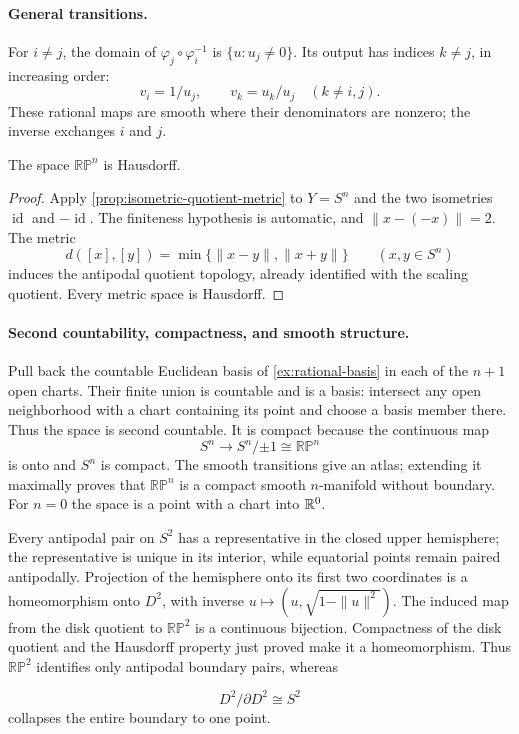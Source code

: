 \paragraph{General transitions.}
For $i\ne j$, the domain of $\varphi_j\circ\varphi_i^{-1}$ is
$\{u:u_j\ne0\}$. Its output has indices $k\ne j$, in increasing order:
\[
v_i=1/u_j,\qquad v_k=u_k/u_j\quad(k\ne i,j).
\]
These rational maps are smooth where their denominators are nonzero;
the inverse exchanges $i$ and $j$.

\begin{proposition}
The space $\mathbb{RP}^n$ is Hausdorff.
\end{proposition}
\begin{proof}
Apply \cref{prop:isometric-quotient-metric} to $Y=S^n$ and the two
isometries $\operatorname{id}$ and $-\operatorname{id}$. The finiteness
hypothesis is automatic, and $\|x-(-x)\|=2$. The metric
\[
d([x],[y])=\min\{\|x-y\|,\|x+y\|\}\qquad(x,y\in S^n)
\]
induces the antipodal quotient topology, already identified with the
scaling quotient. Every metric space is Hausdorff.
\end{proof}

\paragraph{Second countability, compactness, and smooth structure.}
Pull back the countable Euclidean basis of \cref{ex:rational-basis} in
each of the $n+1$ open charts.
Their finite union is countable and is a basis: intersect any open
neighborhood with a chart containing its point and choose a basis member
there. Thus the space is second countable. It is compact because the
continuous map
\[
S^n\to S^n/{\pm1}\cong\mathbb{RP}^n
\]
 is onto and $S^n$
is compact. The smooth transitions give an atlas; extending it maximally
proves that $\mathbb{RP}^n$ is a compact smooth $n$-manifold without boundary.
For $n=0$ the space is a point with a chart into $\mathbb{R}^0$.


\begin{example}
Every antipodal pair on $S^2$ has a representative in the closed upper
hemisphere; the representative is unique in its interior, while equatorial
points remain paired antipodally. Projection of the hemisphere onto its
first two coordinates is a homeomorphism onto $D^2$, with inverse
$u\mapsto(u,\sqrt{1-\|u\|^2})$. The induced map from the disk quotient
to $\mathbb{RP}^2$ is a continuous bijection. Compactness of the disk
quotient and the Hausdorff property just proved make it a homeomorphism.
Thus $\mathbb{RP}^2$ identifies only antipodal boundary pairs, whereas

\[
D^2/\partial D^2\cong S^2
\]
 collapses the entire boundary to one point.
\end{example}

\FloatBarrier

